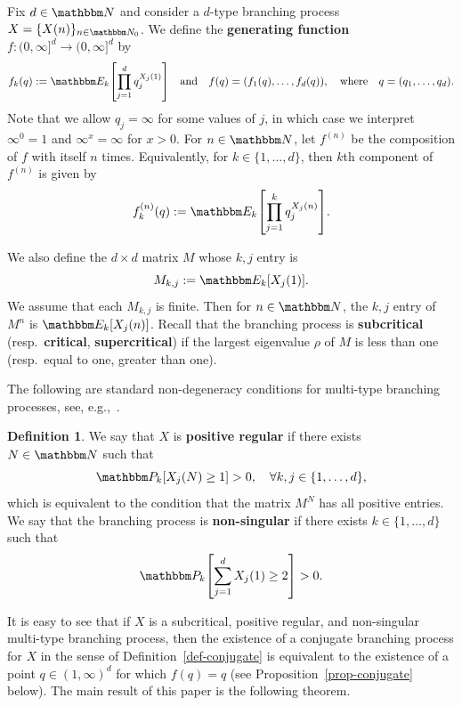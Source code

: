 \documentclass[11pt]{article}
\theoremstyle{plain}
\theoremstyle{definition}
\newtheorem{defn}[thm]{Definition}
\numberwithin{equation}{section}
\newcommand{\eqb}{\begin{equation}}
\newcommand{\eqe}{\end{equation}}
\newcommand{\eqbn}{\begin{equation*}}
\newcommand{\eqen}{\end{equation*}}
\newcommand{\BB}{\mathbbm}
\let\originalleft\left
\let\originalright\right
\renewcommand{\left}{\mathopen{}\mathclose\bgroup\originalleft}
\renewcommand{\right}{\aftergroup\egroup\originalright}
\begin{document}
Fix $d\in\BB N$ and consider a $d$-type branching process $X = \{X(n) \}_{n\in\BB N_0}$. 
We define the \textbf{generating function} $f : (0,\infty]^d \to (0,\infty]^d$ by
\eqb  \label{eqn-generating-function}
f_k(q) := \BB E_k\left[ \prod_{j=1}^d q_j^{X_j(1)} \right] \quad \text{and} \quad f(q) = (f_1(q) ,\dots,f_d(q)) , \quad \text{where} \quad q = (q_1,\dots,q_d) .
\eqe
Note that we allow $q_j = \infty$ for some values of $j$, in which case we interpret $\infty^0 = 1$ and $\infty^x = \infty$ for $x > 0$.   
For $n\in\BB N$, let $f^{(n)}$ be the composition of $f$ with itself $n$ times.
Equivalently, for $k\in \{1,\dots,d\}$, then $k$th component of $f^{(n)}$ is given by 
\eqb \label{eqn-gen-func-n}
f_k^{(n)}(q) := \BB E_k\left[ \prod_{j=1}^k q_j^{X_j(n)} \right]  . 
\eqe 
 
We also define the $d\times d$ matrix $M$ whose $k,j$ entry is 
\eqb \label{eqn-mean-matrix} 
 M_{k,j} :=   \BB E_k[X_j(1)]  .
\eqe 
We assume that each $M_{k,j}$ is finite. 
Then for $n\in\BB N$, the $k,j$ entry of $M^n$ is $\BB E_k[X_j(n)]$. Recall that the branching process is \textbf{subcritical} (resp.\ \textbf{critical}, \textbf{supercritical}) if the largest eigenvalue $\rho$ of $M$ is less than one (resp.\ equal to one, greater than one). 

The following are standard non-degeneracy conditions for multi-type branching processes, see, e.g.,~\cite[Section 6]{an-branching-processes}. 

\begin{defn} \label{def-bp-basic}  
We say that $X$ is \textbf{positive regular} if there exists $N\in\BB N$ such that 
\eqbn
\BB P_k\left[ X_j(N) \geq 1 \right] > 0 ,\quad\forall k,j \in \{1,\dots,d\} ,
\eqen
which is equivalent to the condition that the matrix $M^N$ has all positive entries.
We say that the branching process is \textbf{non-singular} if there exists $k \in\{1,\dots,d\}$ such that
\eqbn
\BB P_k\left[ \sum_{j=1}^d X_j(1) \geq 2 \right] >  0 .
\eqen 
\end{defn}



It is easy to see that if $X$ is a subcritical, positive regular, and non-singular multi-type branching process, then the existence of a conjugate branching process for $X$ in the sense of Definition~\ref{def-conjugate} is equivalent to the existence of a point $q \in (1,\infty)^d$ for which $f(q) = q$ (see Proposition~\ref{prop-conjugate} below). 
The main result of this paper is the following theorem. 
 
\end{document}
